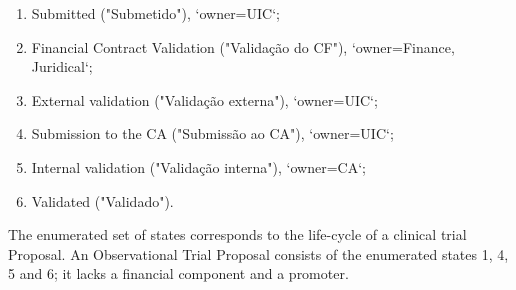\begin{enumerate}
    \item Submitted ("Submetido"), `owner=UIC`;
    \item Financial Contract Validation ("Validação do CF"), `owner=Finance, Juridical`;
    \item External validation ("Validação externa"), `owner=UIC`;
    \item Submission to the CA ("Submissão ao CA"), `owner=UIC`;
    \item Internal validation ("Validação interna"), `owner=CA`;
    \item Validated ("Validado").
\end{enumerate}

The enumerated set of states corresponds to the life-cycle of a clinical trial Proposal. An Observational Trial Proposal consists of the enumerated states 1, 4, 5 and 6; it lacks a financial component and a promoter.  

